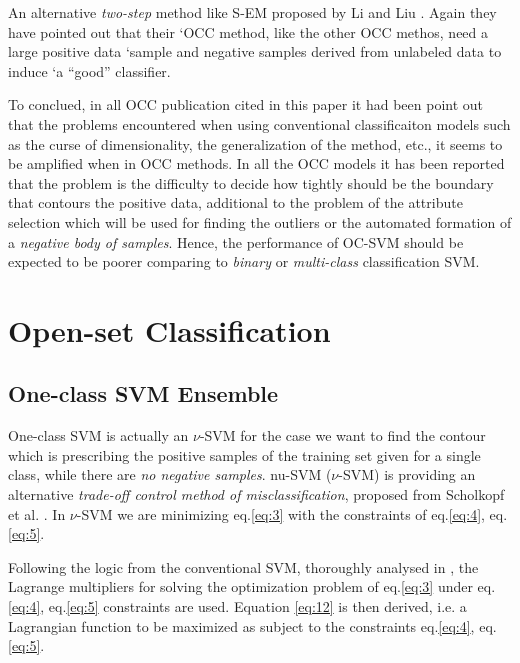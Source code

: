 An alternative \textit{two-step} method like S-EM proposed by Li and Liu \parencite{li2003learning}. Again they have pointed out that their `OCC method, like the other OCC methos, need a large positive data `sample and negative samples derived from unlabeled data to induce `a ``good'' classifier.

To conclued, in all OCC publication cited in this paper it had been point out that the problems encountered when using conventional classificaiton models such as the curse of dimensionality, the generalization of the method, etc., it seems to be amplified when in OCC methods. In all the OCC models it has been reported that the problem is the difficulty to decide how tightly should be the boundary that contours the positive data, additional to the problem of the attribute selection which will be used for finding the outliers or the automated formation of a \textit{negative body of samples}. Hence, the performance of OC-SVM should be expected to be poorer comparing to \textit{binary }or \textit{multi-class} classification SVM\parencite{khan2010survey,manevitz2002one,yu2005single,scholkopf1999estimating,li2003learning}.

\section{Open-set Classification}\label{chap:openset:sec:Openset_Class_Classification}

\subsection{One-class SVM Ensemble}\label{chap:openset:sec:OCSVM_description}
One-class SVM is actually an $\nu$-SVM for the case we want to find the contour which is prescribing the positive samples of the training set given for a single class, while there are \textit{no negative samples}. nu-SVM ($\nu$-SVM) is providing an alternative \textit{trade-off control method of misclassification}, proposed from Scholkopf et al. . In $\nu$-SVM we are minimizing eq.\ref{eq:3} with the constraints of eq.\ref{eq:4}, eq.\ref{eq:5}.

Following the logic from the conventional SVM, thoroughly analysed in , the Lagrange multipliers for solving the optimization problem of eq.\ref{eq:3} under eq.\ref{eq:4}, eq.\ref{eq:5} constraints are used. Equation \ref{eq:12} is then derived, i.e. a Lagrangian function to be maximized as subject to the constraints eq.\ref{eq:4}, eq.\ref{eq:5}.

